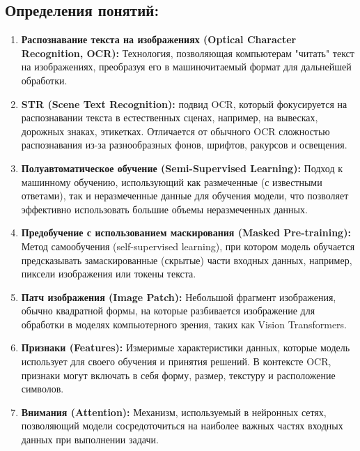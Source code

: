 \subsection{Определения понятий:}

\begin{enumerate}
    \item \textbf{Распознавание текста на изображениях (Optical Character Recognition, OCR):} Технология, позволяющая компьютерам "читать" текст на изображениях, преобразуя его в машиночитаемый формат для дальнейшей обработки.

    \item \textbf{STR (Scene Text Recognition):}  подвид OCR, который фокусируется на распознавании текста в естественных сценах, например, на вывесках, дорожных знаках, этикетках. Отличается от обычного OCR сложностью распознавания из-за разнообразных фонов, шрифтов, ракурсов и освещения.

    \item \textbf{Полуавтоматическое обучение (Semi-Supervised Learning):} Подход к машинному обучению, использующий как размеченные (с известными ответами), так и неразмеченные данные для обучения модели, что позволяет эффективно использовать большие объемы неразмеченных данных.

    \item \textbf{Предобучение с использованием маскирования (Masked Pre-training):} Метод самообучения (self-supervised learning), при котором модель обучается предсказывать замаскированные (скрытые) части входных данных, например, пиксели изображения или токены текста. 

    \item \textbf{Патч изображения (Image Patch):} Небольшой фрагмент изображения, обычно квадратной формы, на которые разбивается изображение для обработки в моделях компьютерного зрения, таких как Vision Transformers.

    \item \textbf{Признаки (Features):}  Измеримые  характеристики  данных,  которые  модель  использует  для  своего  обучения  и  принятия  решений.  В  контексте  OCR,  признаки  могут  включать  в  себя  форму,  размер,  текстуру  и  расположение  символов.

    \item \textbf{Внимания (Attention):} Механизм,  используемый  в  нейронных  сетях,  позволяющий  модели  сосредоточиться  на  наиболее  важных  частях  входных  данных  при  выполнении  задачи.


\end{enumerate}
